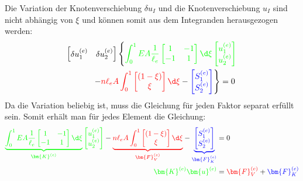 \documentclass[letterpaper,10pt,german]{jupyterBook}
\begin{document}
\sphinxAtStartPar
Die Variation der Knotenverschiebung \(\delta u_I\) und die Knotenverschiebung \(u_I\) sind nicht abhängig von \(\xi\) und können somit aus dem Integranden herausgezogen werden:
\begin{equation}\label{equation:chapters/chapter2/1dFEM:stabFEM2}
\begin{split}\begin{align}
 \begin{bmatrix} \delta u_1^{(e)} & \delta u_2^{(e)}\end{bmatrix}\left\{ \textcolor{green}{   \int_{0}^{1} EA \frac{1}{\ell_e} \begin{bmatrix} 1 & -1 \\ -1 & 1\end{bmatrix}  \d \xi \begin{bmatrix} u_1^{(e)} \\ u_2^{(e)}\end{bmatrix}} \right .\\
 \left .- \textcolor{red}{n \ell_e A \int_0^{1} \begin{bmatrix} (1-\xi)  \\ \xi \end{bmatrix}   \d \xi} - \textcolor{blue}{ \begin{bmatrix} S_1^{(e)} \\ S_2^{(e)} \end{bmatrix}} \right\}  = 0\; 
\end{align}\end{split}
\end{equation}
\sphinxAtStartPar
Da die Variation beliebig ist, muss die Gleichung für jeden Faktor separat erfüllt sein. Somit erhält man für jedes Element die Gleichung:
\begin{equation}\label{equation:chapters/chapter2/1dFEM:stabFEM3}
\begin{split}\begin{align}
  \textcolor{green}{   \underbrace{\int_{0}^{1} EA \frac{1}{\ell_e} \begin{bmatrix} 1 & -1 \\ -1 & 1\end{bmatrix}  \d \xi}_{\bm{K}^{(e)}} \begin{bmatrix} u_1^{(e)} \\ u_2^{(e)}\end{bmatrix}} 
 - \textcolor{red}{ \underbrace{n \ell_e A \int_0^{1} \begin{bmatrix} (1-\xi) \\ \xi  \end{bmatrix}   \d \xi}_{\bm{F}_V^{(e)}}} - \textcolor{blue}{ \underbrace{\begin{bmatrix} S_1^{(e)} \\ S_2^{(e)} \end{bmatrix}}_{\bm{F}_K^{(e)}}}  & = 0\; \\
 \textcolor{green}{\bm{K}^{(e)} \bm{u}^{(e)}} &=  \textcolor{red}{\bm{F}_V^{(e)}} + \textcolor{blue}{\bm{F}_K^{(e)} } 
\end{align}\end{split}
\end{equation}
\end{document}
